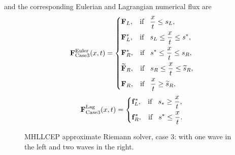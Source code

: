 \documentclass[review]{elsarticle}
\begin{document}
  and the corresponding Eulerian and Lagrangian numerical flux are
 \begin{equation}\label{eq:HLLCEP3}
   \mathbf{F}^{\text{Euler}}_{\text{Case3}}(x,t) = \left\{ \begin{aligned}
        & \mathbf{F}_L, \hspace{0.3cm} \text{if} \hspace{0.3cm} \frac{x}{t}\le s_L, \\
        & \mathbf{F}_L^*, \hspace{0.3cm} \text{if} \hspace{0.3cm} s_L\le \frac{x}{t} \le s^*, \\
        & \mathbf{F}_R^*, \hspace{0.3cm} \text{if} \hspace{0.3cm} s^*\le \frac{x}{t} \le s_R, \\
        &  \widetilde{\mathbf{F}}_R, \hspace{0.3cm} \text{if} \hspace{0.3cm} s_R\le \frac{x}{t} \le \widetilde{s}_R,\\
        & \mathbf{F}_R, \hspace{0.3cm} \text{if} \hspace{0.3cm} \frac{x}{t}\ge \widetilde{s}_R, \\
      \end{aligned}
    \right.
  \end{equation}
\begin{equation}
    \mathbf{F}^{\text{Lag}}_{\text{Case3}}(x,t) = \left\{ \begin{aligned}
        & \mathbf{f}_L^*, \hspace{0.3cm} \text{if} \hspace{0.3cm} s_*\ge \frac{x}{t},\\
        & \mathbf{f}_R^*, \hspace{0.3cm} \text{if} \hspace{0.3cm} s^*\le \frac{x}{t}.\\
      \end{aligned}
    \right.
  \end{equation}
%
\begin{figure}[ht]
  \centering
\caption{MHLLCEP approximate Riemann solver, case 3: with one wave in the left and two waves in  the right.}
\label{fig:case3}
\end{figure}
\end{document}
